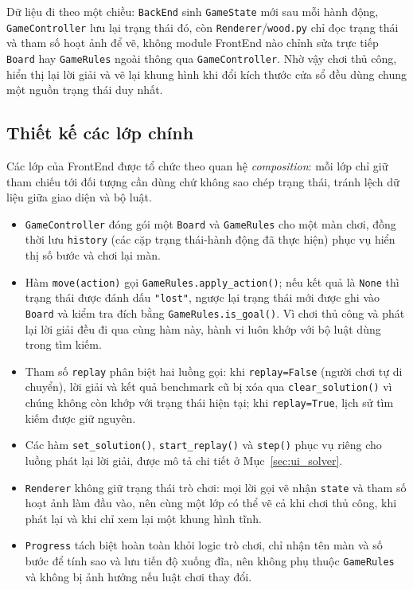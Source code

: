 Dữ liệu đi theo một chiều: \texttt{BackEnd} sinh \texttt{GameState} mới
sau mỗi hành động, \texttt{GameController} lưu lại trạng thái đó, còn
\texttt{Renderer}/\texttt{wood.py} chỉ đọc trạng thái và tham số hoạt ảnh
để vẽ, không module FrontEnd nào chỉnh sửa trực tiếp \texttt{Board} hay
\texttt{GameRules} ngoài thông qua \texttt{GameController}. Nhờ vậy chơi
thủ công, hiển thị lại lời giải và vẽ lại khung hình khi đổi kích thước cửa
sổ đều dùng chung một nguồn trạng thái duy nhất.

\subsection{Thiết kế các lớp chính}

Các lớp của FrontEnd được tổ chức theo quan hệ
\textit{composition}: mỗi lớp chỉ giữ tham chiếu tới đối tượng cần dùng
chứ không sao chép trạng thái, tránh lệch dữ liệu giữa giao diện và bộ
luật.
\begin{itemize}
    \item \texttt{GameController} đóng gói một \texttt{Board} và \texttt{GameRules}
    cho một màn chơi, đồng thời lưu \texttt{history} (các cặp trạng thái-hành
    động đã thực hiện) phục vụ hiển thị số bước và chơi lại màn.
    \item Hàm \texttt{move(action)} gọi \texttt{GameRules.apply\_action()}; nếu kết quả
    là \texttt{None} thì trạng thái được đánh dấu \texttt{"lost"}, ngược lại
    trạng thái mới được ghi vào \texttt{Board} và kiểm tra đích bằng
    \texttt{GameRules.is\_goal()}. Vì chơi thủ công và phát lại lời giải đều
    đi qua cùng hàm này, hành vi luôn khớp với bộ luật dùng trong tìm kiếm.
    \item Tham số \texttt{replay} phân biệt hai luồng gọi: khi \texttt{replay=False}
    (người chơi tự di chuyển), lời giải và kết quả benchmark cũ bị xóa qua
    \texttt{clear\_solution()} vì chúng không còn khớp với trạng thái hiện tại;
    khi \texttt{replay=True}, lịch sử tìm kiếm được giữ nguyên.
    \item Các hàm \texttt{set\_solution()}, \texttt{start\_replay()} và
    \texttt{step()} phục vụ riêng cho luồng phát lại lời giải, được mô tả
    chi tiết ở Mục~\ref{sec:ui_solver}.
    \item \texttt{Renderer} không giữ trạng thái trò chơi: mọi lời gọi vẽ nhận
    \texttt{state} và tham số hoạt ảnh làm đầu vào, nên cùng một lớp có thể vẽ
    cả khi chơi thủ công, khi phát lại và khi chỉ xem lại một khung hình tĩnh.
    \item \texttt{Progress} tách biệt hoàn toàn khỏi logic trò chơi, chỉ nhận
    tên màn và số bước để tính sao và lưu tiến độ xuống đĩa, nên không phụ thuộc
    \texttt{GameRules} và không bị ảnh hưởng nếu luật chơi thay đổi.
\end{itemize}

